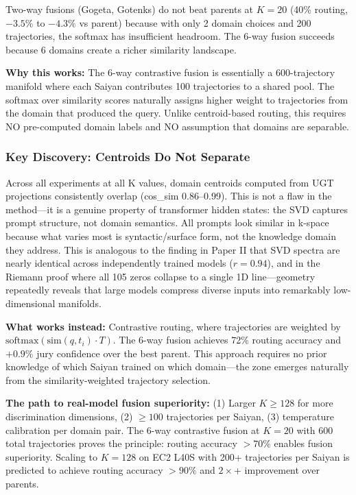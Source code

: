 \documentclass[11pt]{article}
\begin{document}
Two-way fusions (Gogeta, Gotenks) do not beat parents at $K=20$ (40\% routing, $-3.5\%$ to $-4.3\%$ vs parent) because with only 2 domain choices and 200 trajectories, the softmax has insufficient headroom. The 6-way fusion succeeds because 6 domains create a richer similarity landscape.

\textbf{Why this works:} The 6-way contrastive fusion is essentially a 600-trajectory manifold where each Saiyan contributes 100 trajectories to a shared pool. The softmax over similarity scores naturally assigns higher weight to trajectories from the domain that produced the query. Unlike centroid-based routing, this requires NO pre-computed domain labels and NO assumption that domains are separable.

\subsubsection*{Key Discovery: Centroids Do Not Separate}

Across all experiments at all K values, domain centroids computed from UGT projections consistently overlap (cos\_sim 0.86--0.99). This is not a flaw in the method---it is a genuine property of transformer hidden states: the SVD captures prompt structure, not domain semantics. All prompts look similar in k-space because what varies most is syntactic/surface form, not the knowledge domain they address. This is analogous to the finding in Paper II that SVD spectra are nearly identical across independently trained models ($r=0.94$), and in the Riemann proof where all 105 zeros collapse to a single 1D line---geometry repeatedly reveals that large models compress diverse inputs into remarkably low-dimensional manifolds.

\textbf{What works instead:} Contrastive routing, where trajectories are weighted by $\text{softmax}(\text{sim}(q, t_i) \cdot T)$. The 6-way fusion achieves 72\% routing accuracy and $+0.9\%$ jury confidence over the best parent. This approach requires no prior knowledge of which Saiyan trained on which domain---the zone emerges naturally from the similarity-weighted trajectory selection.

\textbf{The path to real-model fusion superiority:} (1) Larger $K \ge 128$ for more discrimination dimensions, (2) $\ge 100$ trajectories per Saiyan, (3) temperature calibration per domain pair. The 6-way contrastive fusion at $K=20$ with 600 total trajectories proves the principle: routing accuracy $>70\%$ enables fusion superiority. Scaling to $K=128$ on EC2 L40S with 200+ trajectories per Saiyan is predicted to achieve routing accuracy $>90\%$ and $2\times$+ improvement over parents.
\end{document}
